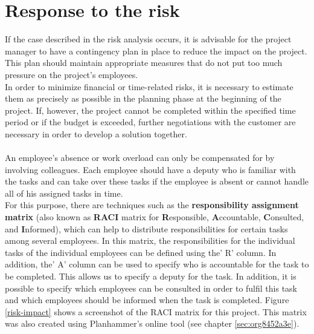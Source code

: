 \section{Response to the risk}
If the case described in the risk analysis occurs, it is advisable for the project manager to have a contingency plan in place to reduce the impact on the project. This plan should maintain appropriate measures that do not put too much pressure on the project's employees.
\\
In order to minimize financial or time-related risks, it is necessary to estimate them as precisely as possible in the planning phase at the beginning of the project. If, however, the project cannot be completed within the specified time period or if the budget is exceeded, further negotiations with the customer are necessary in order to develop a solution together.
\\\\
An employee's absence or work overload can only be compensated for by involving colleagues. Each employee should have a deputy who is familiar with the tasks and can take over these tasks if the employee is absent or cannot handle all of his assigned tasks in time. 
\\
For this purpose, there are techniques such as the \textbf{responsibility assignment matrix} (also known as \textbf{RACI} matrix for \textbf{R}esponsible, \textbf{A}ccountable, \textbf{C}onsulted, and \textbf{I}nformed), which can help to distribute responsibilities for certain tasks among several employees. In this matrix, the responsibilities for the individual tasks of the individual employees can be defined using the' R' column. In addition, the' A' column can be used to specify who is accountable for the task to be completed. This allows us to specify a deputy for the task. In addition, it is possible to specify which employees can be consulted in order to fulfil this task and which employees should be informed when the task is completed. Figure \ref{risk-impact} shows a screenshot of the RACI matrix for this project. This matrix was also created using Planhammer's online tool (see chapter \ref{sec:org8452a3e}).
